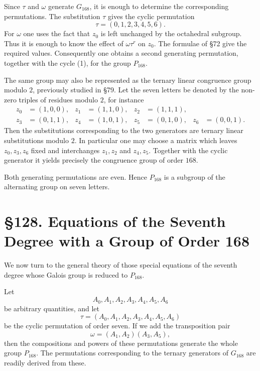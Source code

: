 \documentclass[12pt,a4paper]{article}
\newcommand{\webersection}[2]{\clearpage\section*{\S #1. #2}}
\begin{document}
Since \(\tau\) and \(\omega\) generate \(G_{168}\), it is enough to determine the corresponding permutations.  The substitution \(\tau\) gives the cyclic permutation
\begin{equation}
 \tau=(0,1,2,3,4,5,6). \tag{1}
\end{equation}
For \(\omega\) one uses the fact that \(z_0\) is left unchanged by the octahedral subgroup.  Thus it is enough to know the effect of \(\omega\tau^r\) on \(z_0\).  The formulae of \S 72 give the required values.  Consequently one obtains a second generating permutation, together with the cycle (1), for the group \(P_{168}\).

The same group may also be represented as the ternary linear congruence group modulo \(2\), previously studied in \S 79.  Let the seven letters be denoted by the non-zero triples of residues modulo \(2\), for instance
\begin{align*}
 z_0&=(1,0,0), & z_1&=(1,1,0), & z_2&=(1,1,1),\\
 z_3&=(0,1,1), & z_4&=(1,0,1), & z_5&=(0,1,0), & z_6&=(0,0,1).
\end{align*}
Then the substitutions corresponding to the two generators are ternary linear substitutions modulo \(2\).  In particular one may choose a matrix which leaves \(z_0,z_3,z_6\) fixed and interchanges \(z_1,z_2\) and \(z_4,z_5\).  Together with the cyclic generator it yields precisely the congruence group of order \(168\).

Both generating permutations are even.  Hence \(P_{168}\) is a subgroup of the alternating group on seven letters.

\webersection{128}{Equations of the Seventh Degree with a Group of Order 168}

We now turn to the general theory of those special equations of the seventh degree whose Galois group is reduced to \(P_{168}\).

Let
\[
 A_0,A_1,A_2,A_3,A_4,A_5,A_6
\]
be arbitrary quantities, and let
\begin{equation}
 \tau=(A_0,A_1,A_2,A_3,A_4,A_5,A_6) \tag{1}
\end{equation}
be the cyclic permutation of order seven.  If we add the transposition pair
\begin{equation}
 \omega=(A_1,A_2)(A_3,A_5), \tag{2}
\end{equation}
then the compositions and powers of these permutations generate the whole group \(P_{168}\).  The permutations corresponding to the ternary generators of \(G_{168}\) are readily derived from these.
\end{document}
